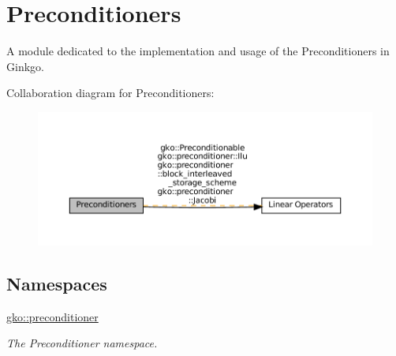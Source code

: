 \hypertarget{group__precond}{}\section{Preconditioners}
\label{group__precond}


A module dedicated to the implementation and usage of the Preconditioners in Ginkgo.  


Collaboration diagram for Preconditioners\+:
\nopagebreak
\begin{figure}[H]
\begin{center}
\leavevmode
\includegraphics[width=350pt]{group__precond}
\end{center}
\end{figure}
\subsection*{Namespaces}
\begin{DoxyCompactItemize}
\item 
 \hyperlink{namespacegko_1_1preconditioner}{gko\+::preconditioner}
\begin{DoxyCompactList}\small\item\em The Preconditioner namespace. \end{DoxyCompactList}\end{DoxyCompactItemize}
